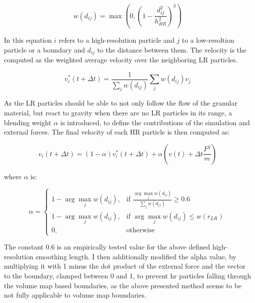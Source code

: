 \documentclass[intern]{cgMA}
\begin{document}
    \begin{equation}
        w(d_{ij}) = \max(0, (1 - \frac{d_{ij}^2}{h_{HR}^2})^3)
    \end{equation}

    In this equation $i$ refers to a high-resolution particle and $j$ to a low-resoltion particle or a boundary and $d_{ij}$ to the distance between them. The velocity is the computed as the weighted average velocity over the neighboring LR particles.\cite{10.2312:PE:vriphys:vriphys12:053-060}

    \begin{equation}
        v_i^*(t + \Delta t) = \frac{1}{\sum_j w(d_{ij})}\sum_j w(d_{ij})v_j
    \end{equation}

    As the LR particles should be able to not only follow the flow of the granular material, but react to gravity when there are no LR particles in its range, a blending weight $\alpha$ is introduced, to define the contributions of the simulation and external forces. The final velocity of each HR particle is then computed as:

    \begin{equation}
        v_i(t + \Delta t)  = (1 - \alpha)v_i^*(t + \Delta t) + \alpha(v(t) + \Delta t \frac{F^g}{m})
    \end{equation}

    where $\alpha$ is:

    \begin{equation}
        \alpha = 
        \begin{cases}
            1 - \arg \max_j w(d_{ij}),& \text{if } \frac{\arg \max_j w(d_{ij})}{\sum_j w(d_{ij})} \geq 0.6 \\
            1 - \arg \max_j w(d_{ij}),& \text{if } \arg \max_j w(d_{ij}) \leq w(r_{LR}) \\
            0,              & \text{otherwise}
        \end{cases}
    \end{equation}

    The constant $0.6$ is an empirically tested value for the above defined high-resolution smoothing length. \cite{10.2312:PE:vriphys:vriphys12:053-060} I then additionally modified the alpha value, by multiplying it with 1 minus the dot product of the external force and the vector to the boundary, clamped between 0 and 1, to prevent hr particles falling through the volume map based boundaries, as the above presented method seems to be not fully applicable to volume map boundaries.
    
\end{document}

